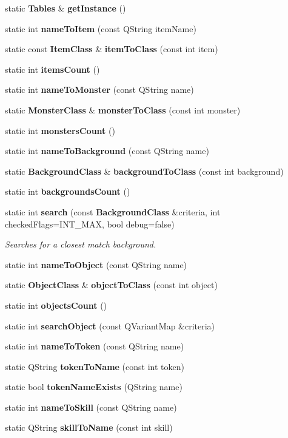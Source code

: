 \begin{CompactItemize}
\item 
static {\bf Tables} \& {\bf get\-Instance} ()
\item 
static int {\bf name\-To\-Item} (const QString item\-Name)
\item 
static const {\bf Item\-Class} \& {\bf item\-To\-Class} (const int item)
\item 
static int {\bf items\-Count} ()
\item 
static int {\bf name\-To\-Monster} (const QString name)
\item 
static {\bf Monster\-Class} \& {\bf monster\-To\-Class} (const int monster)
\item 
static int {\bf monsters\-Count} ()
\item 
static int {\bf name\-To\-Background} (const QString name)
\item 
static {\bf Background\-Class} \& {\bf background\-To\-Class} (const int background)
\item 
static int {\bf backgrounds\-Count} ()
\item 
static int {\bf search} (const {\bf Background\-Class} \&criteria, int checked\-Flags=INT\_\-MAX, bool debug=false)
\begin{CompactList}\small\item\em Searches for a closest match background. \item\end{CompactList}\item 
static int {\bf name\-To\-Object} (const QString name)
\item 
static {\bf Object\-Class} \& {\bf object\-To\-Class} (const int object)
\item 
static int {\bf objects\-Count} ()
\item 
static int {\bf search\-Object} (const QVariant\-Map \&criteria)
\item 
static int {\bf name\-To\-Token} (const QString name)
\item 
static QString {\bf token\-To\-Name} (const int token)
\item 
static bool {\bf token\-Name\-Exists} (QString name)
\item 
static int {\bf name\-To\-Skill} (const QString name)
\item 
static QString {\bf skill\-To\-Name} (const int skill)
\end{CompactItemize}

